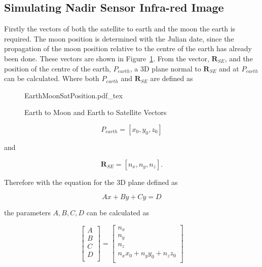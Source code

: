 \subsection{Simulating Nadir Sensor Infra-red Image}
Firstly the vectors of both the satellite to earth and the moon the earth is required. The moon position is determined with the Julian date, since the propagation of the moon position relative to the centre of the earth has already been done. These vectors are shown in Figure~\ref{fig:EarthMoonSatPosition}. From the vector, $\mathbf{R}_{SE}$, and the position of the centre of the earth, $P_{earth}$, a 3D plane normal to $\mathbf{R}_{SE}$ and at $P_{earth}$ can be calculated. Where both $P_{earth}$ and $\mathbf{R}_{SE}$ are defined as

\begin{figure}[!htb]
	\centering
	\def\svgwidth{14cm}
	{EarthMoonSatPosition.pdf_tex}
	\caption{Earth to Moon and Earth to Satellite Vectors}
	\label{fig:EarthMoonSatPosition}
\end{figure}

\begin{equation}
	P_{earth} = [x_0, y_0, z_0]
\end{equation}

and  

\begin{equation}
	\mathbf{R}_{SE} = [n_x, n_y, n_z].
\end{equation}

Therefore with the equation for the 3D plane defined as 

\begin{equation}
Ax + By + Cy = D
\end{equation}

the parameters $A, B, C, D$ can be calculated as

\begin{equation}
\begin{bmatrix}
	A\\
	B\\
	C\\
	D\\
\end{bmatrix} = \begin{bmatrix}
n_x\\
n_y\\
n_z\\
n_xx_0 + n_yy_0 + n_zz_0\\
\end{bmatrix}
\end{equation}


